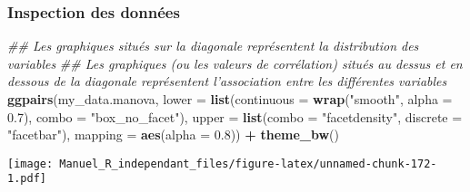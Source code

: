 \documentclass[
]{book}
\newenvironment{Shaded}{\begin{snugshade}}{\end{snugshade}}
\newcommand{\CommentTok}[1]{\textcolor[rgb]{0.56,0.35,0.01}{\textit{#1}}}
\newcommand{\DataTypeTok}[1]{\textcolor[rgb]{0.13,0.29,0.53}{#1}}
\newcommand{\FloatTok}[1]{\textcolor[rgb]{0.00,0.00,0.81}{#1}}
\newcommand{\KeywordTok}[1]{\textcolor[rgb]{0.13,0.29,0.53}{\textbf{#1}}}
\newcommand{\NormalTok}[1]{#1}
\newcommand{\OperatorTok}[1]{\textcolor[rgb]{0.81,0.36,0.00}{\textbf{#1}}}
\newcommand{\StringTok}[1]{\textcolor[rgb]{0.31,0.60,0.02}{#1}}
\begin{document}
\begin{Shaded}
\end{Shaded}

\hypertarget{inspection-des-donnuxe9es-19}{%
\subsubsection{Inspection des données}\label{inspection-des-donnuxe9es-19}}

\begin{Shaded}
\begin{Highlighting}[]
\CommentTok{## Les graphiques situés sur la diagonale représentent la distribution des variables}
\CommentTok{## Les graphiques (ou les valeurs de corrélation) situés au dessus et en dessous de la diagonale représentent l'association entre les différentes variables}
\KeywordTok{ggpairs}\NormalTok{(my_data.manova,}
        \DataTypeTok{lower =} \KeywordTok{list}\NormalTok{(}\DataTypeTok{continuous =} \KeywordTok{wrap}\NormalTok{(}\StringTok{"smooth"}\NormalTok{, }\DataTypeTok{alpha =} \FloatTok{0.7}\NormalTok{), }\DataTypeTok{combo =} \StringTok{"box_no_facet"}\NormalTok{),}
        \DataTypeTok{upper =} \KeywordTok{list}\NormalTok{(}\DataTypeTok{combo =} \StringTok{"facetdensity"}\NormalTok{, }\DataTypeTok{discrete =} \StringTok{"facetbar"}\NormalTok{), }
        \DataTypeTok{mapping =} \KeywordTok{aes}\NormalTok{(}\DataTypeTok{alpha =} \FloatTok{0.8}\NormalTok{)) }\OperatorTok{+}\StringTok{ }\KeywordTok{theme_bw}\NormalTok{()}
\end{Highlighting}
\end{Shaded}

\texttt{[image: Manuel\_R\_independant\_files/figure-latex/unnamed-chunk-172-1.pdf]}
\end{document}
